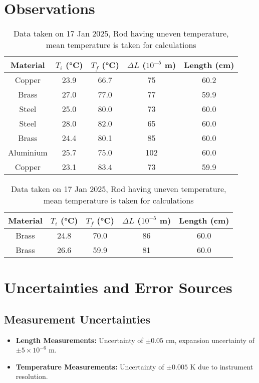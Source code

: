 \documentclass[%
 sor,
 jor,
 amsmath,amssymb,
 reprint,
]{revtex4-2}
\begin{document}
\section{Observations}

\begin{table}[h]
\centering
\begin{tabular}{|ccccc|}
    \hline
    Material & $T_i$ (\si{\celsius}) & $T_f$ (\si{\celsius}) &  $\Delta L$ ($10^{-5}$ m) & Length (cm) \\
    \hline
    Copper & 23.9 & 66.7 & 75 &  60.2 \\
    Brass & 27.0 & 77.0 & 77 & 59.9 \\
    Steel & 25.0 & 80.0  & 73 & 60.0 \\
    Steel & 28.0 & 82.0 & 65 & 60.0 \\
    Brass & 24.4 & 80.1 & 85 &  60.0\\
    Aluminium & 25.7 & 75.0 & 102 & 60.0\\
    Copper & 23.1 & 83.4 & 73 & 59.9 \\
    \hline
\end{tabular}
\caption{Data taken on 15 Jan 2025}
\vspace{1cm}
\centering
\begin{tabular}{|ccccc|}
    \hline
    Material & $T_i$ (\si{\celsius}) & $T_f$ (\si{\celsius}) &  $\Delta L$ ($10^{-5}$ m) & Length (cm) \\
    \hline
    Brass & 24.8 & 70.0 & 86&  60.0\\
    Brass & 26.6 & 59.9 & 81 & 60.0\\
    \hline
\end{tabular}
\caption{Data taken on 17 Jan 2025, Rod having uneven temperature, mean  temperature is taken for calculations}

\end{table}

\section{Uncertainties and Error Sources}
\subsection{Measurement Uncertainties}
\begin{itemize}
    \item \textbf{Length Measurements:} Uncertainty of $\pm 0.05$ cm, expansion uncertainty of $\pm 5\times 10^{-6}$ m.
    \item \textbf{Temperature Measurements:} Uncertainty of $\pm 0.005$ \si{\kelvin} due to instrument resolution.
\end{itemize}
\end{document}
